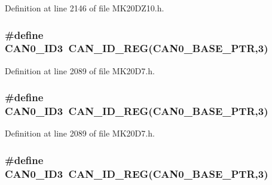 Definition at line 2146 of file M\+K20\+D\+Z10.\+h.

\subsubsection[{\texorpdfstring{C\+A\+N0\+\_\+\+I\+D3}{CAN0_ID3}}]{\setlength{\rightskip}{0pt plus 5cm}\#define C\+A\+N0\+\_\+\+I\+D3~{\bf C\+A\+N\+\_\+\+I\+D\+\_\+\+R\+EG}({\bf C\+A\+N0\+\_\+\+B\+A\+S\+E\+\_\+\+P\+TR},3)}\hypertarget{group___c_a_n___register___accessor___macros_gaf2c24da71b12381d638c21b1d10d4f0b}{}\label{group___c_a_n___register___accessor___macros_gaf2c24da71b12381d638c21b1d10d4f0b}


Definition at line 2089 of file M\+K20\+D7.\+h.

\subsubsection[{\texorpdfstring{C\+A\+N0\+\_\+\+I\+D3}{CAN0_ID3}}]{\setlength{\rightskip}{0pt plus 5cm}\#define C\+A\+N0\+\_\+\+I\+D3~{\bf C\+A\+N\+\_\+\+I\+D\+\_\+\+R\+EG}({\bf C\+A\+N0\+\_\+\+B\+A\+S\+E\+\_\+\+P\+TR},3)}\hypertarget{group___c_a_n___register___accessor___macros_gaf2c24da71b12381d638c21b1d10d4f0b}{}\label{group___c_a_n___register___accessor___macros_gaf2c24da71b12381d638c21b1d10d4f0b}


Definition at line 2089 of file M\+K20\+D7.\+h.

\subsubsection[{\texorpdfstring{C\+A\+N0\+\_\+\+I\+D3}{CAN0_ID3}}]{\setlength{\rightskip}{0pt plus 5cm}\#define C\+A\+N0\+\_\+\+I\+D3~{\bf C\+A\+N\+\_\+\+I\+D\+\_\+\+R\+EG}({\bf C\+A\+N0\+\_\+\+B\+A\+S\+E\+\_\+\+P\+TR},3)}\hypertarget{group___c_a_n___register___accessor___macros_gaf2c24da71b12381d638c21b1d10d4f0b}{}\label{group___c_a_n___register___accessor___macros_gaf2c24da71b12381d638c21b1d10d4f0b}


